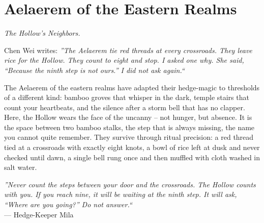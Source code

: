 \documentclass[12pt,oneside]{book}
\begin{document}
\newpage

\newpage

\chapter{Aelaerem of the Eastern Realms}
\emph{The Hollow's Neighbors.}

\noindent
Chen Wei writes: \textit{''The Aelaerem tie red threads at every crossroads. They leave rice for the Hollow. They count to eight and stop. I asked one why. She said, ``Because the ninth step is not ours.'' I did not ask again.``}

\noindent
The Aelaerem of the eastern realms have adapted their hedge-magic to thresholds of a different kind: bamboo groves that whisper in the dark, temple stairs that count your heartbeats, and the silence after a storm bell that has no clapper. Here, the Hollow wears the face of the uncanny -- not hunger, but absence. It is the space between two bamboo stalks, the step that is always missing, the name you cannot quite remember. They survive through ritual precision: a red thread tied at a crossroads with exactly eight knots, a bowl of rice left at dusk and never checked until dawn, a single bell rung once and then muffled with cloth washed in salt water.

\vspace{0.5em}
\noindent\textit{''Never count the steps between your door and the crossroads. The Hollow counts with you. If you reach nine, it will be waiting at the ninth step. It will ask, ``Where are you going?'' Do not answer.``} \\
--- Hedge-Keeper Mila
\end{document}
